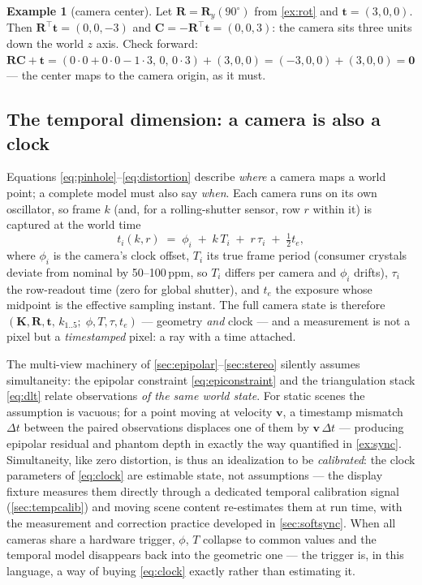 \documentclass[11pt]{article}
\theoremstyle{definition}
\newtheorem{example}{Example}
\newcommand{\mat}[1]{\mathbf{#1}}
\newcommand{\vect}[1]{\mathbf{#1}}
\newcommand{\R}{\mat{R}}
\newcommand{\K}{\mat{K}}
\newcommand{\tv}{\vect{t}}
\newcommand{\Cv}{\vect{C}}
\begin{document}
\begin{example}[camera center]
\label{ex:center}
Let $\R=\R_y(90^\circ)$ from \autoref{ex:rot} and $\tv=(3,0,0)$. Then
$\R^{\!\top}\tv=(0,0,-3)$ and $\Cv=-\R^{\!\top}\tv=(0,0,3)$: the camera sits
three units down the world $z$ axis. Check forward:
$\R\Cv+\tv=(0\!\cdot\!0+0\!\cdot\!0-1\!\cdot\!3,\,0,\,0\!\cdot\!3)+(3,0,0)
=(-3,0,0)+(3,0,0)=\vect0$ --- the center maps to the camera origin, as it
must.
\end{example}

\subsection{The temporal dimension: a camera is also a clock}
\label{sec:timemodel}

Equations \eqref{eq:pinhole}--\eqref{eq:distortion} describe \emph{where}
a camera maps a world point; a complete model must also say \emph{when}.
Each camera runs on its own oscillator, so frame $k$ (and, for a
rolling-shutter sensor, row $r$ within it) is captured at the world time
\begin{equation}
t_i(k, r) \;=\; \phi_i \;+\; k\,T_i \;+\; r\,\tau_i \;+\; \tfrac12 t_e,
\label{eq:clock}
\end{equation}
where $\phi_i$ is the camera's clock offset, $T_i$ its true frame period
(consumer crystals deviate from nominal by 50--100\,ppm, so $T_i$ differs
per camera and $\phi_i$ drifts), $\tau_i$ the row-readout time (zero for
global shutter), and $t_e$ the exposure whose midpoint is the effective
sampling instant. The full camera state is therefore
$(\K,\R,\tv,\,k_{1..5};\;\phi,T,\tau,t_e)$ --- geometry \emph{and}
clock --- and a measurement is not a pixel but a \emph{timestamped}
pixel: a ray with a time attached.

The multi-view machinery of
\autoref{sec:epipolar}--\autoref{sec:stereo} silently assumes
simultaneity: the epipolar constraint \eqref{eq:epiconstraint} and the
triangulation stack \eqref{eq:dlt} relate observations \emph{of the same
world state}. For static scenes the assumption is vacuous; for a point
moving at velocity $\vect v$, a timestamp mismatch $\Delta t$ between the
paired observations displaces one of them by $\vect v\,\Delta t$ ---
producing epipolar residual and phantom depth in exactly the way
quantified in \autoref{ex:sync}. Simultaneity, like zero distortion, is
thus an idealization to be \emph{calibrated}: the clock parameters of
\eqref{eq:clock} are estimable state, not assumptions --- the display
fixture measures them directly through a dedicated temporal calibration
signal (\autoref{sec:tempcalib}) and moving scene content re-estimates
them at run time, with the measurement and correction practice developed
in \autoref{sec:softsync}. When all cameras share a hardware trigger,
$\phi$, $T$ collapse to common values and the temporal model disappears
back into the geometric one --- the trigger is, in this language, a way
of buying \eqref{eq:clock} exactly rather than estimating it.
\end{document}
